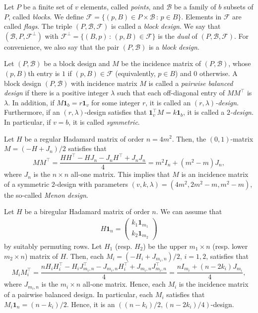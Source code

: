 \documentclass[10pt]{amsart}
\theoremstyle{definition}
\newcommand*\tra{\top}
\newcommand*{\un}{\mathbf{1}}
\begin{document}
Let $P$ be a finite set of $v$ elements, called \emph{points}, and ${\mathcal B}$ be a family of $b$ subsets of $P$, called \emph{blocks}. We define ${\mathcal F}=\{(p,B)\in P\times {\mathcal B}\,:\,p\in B\}$. Elements in ${\mathcal F}$ are called \emph{flags}. The triple $(P,{\mathcal B},{\mathcal F})$ is called a \emph{block design}. We say that $({\mathcal B},P,{\mathcal F}^\perp)$ with ${\mathcal F}^\perp=\{(B,p)\,:\,(p,B)\in {\mathcal F}\}$ is the \emph{dual} of $(P,{\mathcal B},{\mathcal F})$. For convenience, we also say that the pair $(P,{\mathcal B})$ is a \emph{block design}.

Let $(P,{\mathcal B})$ be a block design and $M$ be the incidence matrix of $(P,{\mathcal B})$, whose $(p,B)$th entry is $1$ if $(p,B)\in {\mathcal F}$ (equivalently, $p\in B$) and $0$ otherwise. A block design $(P,{\mathcal B})$ with incidence matrix $M$ is called a \emph{pairwise balanced design} if there is a positive integer $\lambda$ such that each off-diagonal entry of $MM^\tra$ is $\lambda$. In addition, if $M \un_b=r \un_v$ for some integer $r$, it is called an \emph{$(r,\lambda)$-design}. Furthermore, if an $(r,\lambda)$-design satisfies that $\un_v^\tra M=k \un_b$, it is called a \emph{$2$-design}. In particular, if $v=b$, it is called \emph{symmetric}.

Let $H$ be a regular Hadamard matrix of order $n=4m^2$. Then, the $(0,1)$-matrix $M=(-H+J_n)/2$ satisfies that
\[
MM^\tra=\frac{HH^\tra-HJ_{n}-J_{n}H^\tra+J_{n}J_{n}}{4}=m^2I_{n}+(m^2-m)J_{n},
\]
where $J_n$ is the $n\times n$ all-one matrix. This implies that $M$ is an incidence matrix of a symmetric $2$-design with parameters $(v,k,\lambda)=(4m^2,2m^2-m,m^2-m)$, the so-called \emph{Menon design}.

Let $H$ be a biregular Hadamard matrix of order $n$. We can assume that
\begin{align*}
H\un_n=
\begin{pmatrix} k_1 \un_{m_1}\\ k_2 \un_{m_2}
\end{pmatrix}
\end{align*}
by suitably permuting rows. Let $H_1$ (resp. $H_2$) be the upper $m_1\times n$ (resp. lower $m_2\times n$) matrix of $H$. Then, each $M_i=(-H_i+J_{m_i,n})/2$, $i=1,2$, satisfies that
\[
M_iM_i^\tra=\frac{nH_iH_i^\tra-H_iJ_{m_i,n}^\tra-J_{m_i,n}H_i^\tra+J_{m_i,n}J_{m_i,n}^\tra}{4}=\frac{nI_{m_i}+(n-2k_i)J_{m_i}}{4},
\]
where $J_{m_i,n}$ is the $m_i\times n$ all-one matrix. Hence, each $M_i$ is the incidence matrix of a pairwise balanced design. In particular, each $M_i$ satisfies that $M_i\un_n=(n-k_i)/2$. Hence, it is an $((n-k_i)/2,(n-2k_i)/4)$-design.
\end{document}
